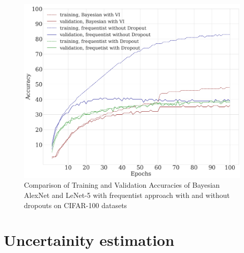 \begin{figure}[H] 
\begin{center}
\includegraphics[width=\linewidth]{Chapter5/Figs/results_regularization.png}
\caption{Comparison of Training and Validation Accuracies of Bayesian AlexNet and LeNet-5 with frequentist approach with and without dropouts on CIFAR-100 datasets}
\label{fig:regularization}
\end{center}
\end{figure} 

\section{Uncertainity estimation}

